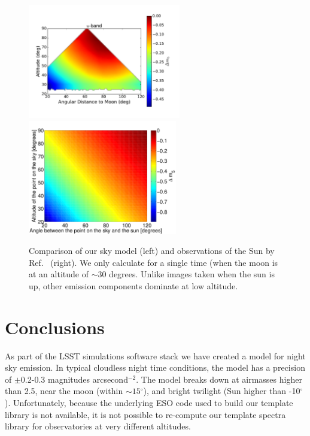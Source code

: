 \documentclass[]{spie}
\newcommand\degree{{^\circ}}
\begin{document}
\begin{figure}
  \begin{center}
  \includegraphics[height=5cm]{plots/deltam5.pdf}\includegraphics[height=5cm]{plots/a1_alt_angle_meshgrid.pdf}
  \end{center}
  \caption{ Comparison of our sky model (left) and observations of the Sun by Ref.~ (right).  We only calculate for a single time (when the moon is at an altitude of $\sim 30$ degrees. Unlike images taken when the sun is up, other emission components dominate at low altitude.  \label{fig:cCompare}}
\end{figure}

\section{Conclusions}

As part of the LSST simulations software stack we have created a model for night sky emission.  In typical cloudless night time conditions, the model has a precision of $\pm$0.2-0.3 magnitudes arcsecond$^{-2}$. The model breaks down at airmasses higher than 2.5, near the moon (within $\sim15\degree$), and bright twilight (Sun higher than -10$\degree$).  Unfortunately, because the underlying ESO code used to build our template library is not available, it is not possible to re-compute our template spectra library for observatories at very different altitudes.  

\acknowledgments        
 
\end{document}

